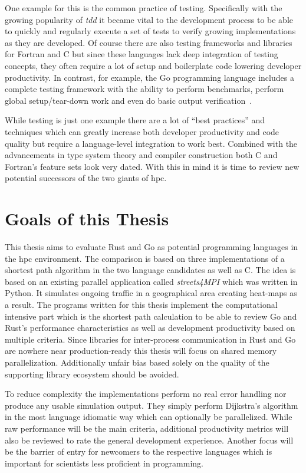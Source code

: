 One example for this is the common practice of testing. Specifically with the growing popularity of \textit{\gls{tdd}} it became vital to the development process to be able to quickly and regularly execute a set of tests to verify growing implementations as they are developed. Of course there are also testing frameworks and libraries for Fortran and C but since these languages lack deep integration of testing concepts, they often require a lot of setup and boilerplate code lowering developer productivity. In contrast, for example, the Go programming language includes a complete testing framework with the ability to perform benchmarks, perform global setup/tear-down work and even do basic output verification~\cite{go_doc_testing}.

While testing is just one example there are a lot of ``best practices'' and techniques which can greatly increase both developer productivity and code quality but require a language-level integration to work best. Combined with the advancements in type system theory and compiler construction both C and Fortran's feature sets look very dated. With this in mind it is time to review new potential successors of the two giants of \gls{hpc}.

\section{Goals of this Thesis}
\label{sec:Introduction::Goals}

This thesis aims to evaluate Rust and Go as potential programming languages in the \gls{hpc} environment. The comparison is based on three implementations of a shortest path algorithm in the two language candidates as well as C. The idea is based on an existing parallel application called \textit{streets4MPI} which was written in Python. It simulates ongoing traffic in a geographical area creating heat-maps as a result. The programs written for this thesis implement the computational intensive part which is the shortest path calculation to be able to review Go and Rust's performance characteristics as well as development productivity based on multiple criteria. Since libraries for inter-process communication in Rust and Go are nowhere near production-ready this thesis will focus on shared memory parallelization. Additionally unfair bias based solely on the quality of the supporting library ecosystem should be avoided.

To reduce complexity the implementations perform no real error handling nor produce any usable simulation output. They simply perform Dijkstra's algorithm in the most language idiomatic way which can optionally be parallelized. While raw performance will be the main criteria, additional productivity metrics will also be reviewed to rate the general development experience. Another focus will be the barrier of entry for newcomers to the respective languages which is important for scientists less proficient in programming.

